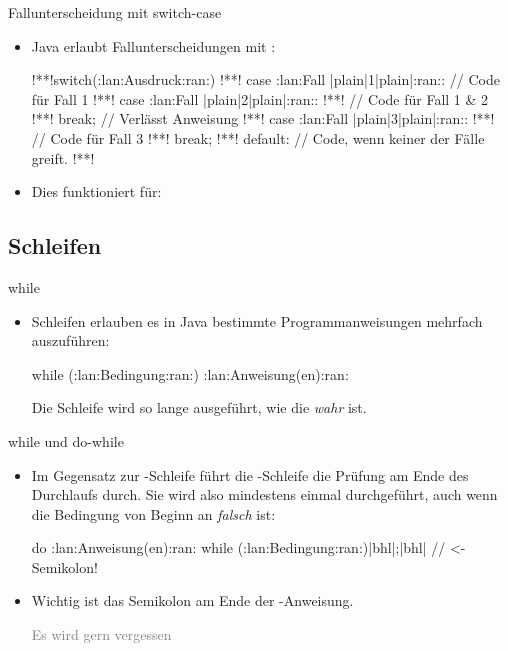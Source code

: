 \begin{frame}[fragile]{Fallunterscheidung mit switch-case}
    \begin{itemize}[<+(1)->]
        \item Java erlaubt Fallunterscheidungen mit :\pause{}
\begin{plainjava}
!**!switch(:lan:Ausdruck:ran:){
!**!    case :lan:Fall |plain|1|plain|:ran:: // Code für Fall 1
!**!    case :lan:Fall |plain|2|plain|:ran::
!**!        // Code für Fall 1 & 2
!**!        break; // Verlässt Anweisung
!**!    case :lan:Fall |plain|3|plain|:ran::
!**!        // Code für Fall 3
!**!        break;
!**!    default: // Code, wenn keiner der Fälle greift.
!**!}
\end{plainjava}
    \item<10-> Dies funktioniert für: 
    \end{itemize}
\end{frame}

\subsection{Schleifen}

\begin{frame}[fragile]{while}
    \begin{itemize}[<+(1)->]
        \item Schleifen erlauben es in Java bestimmte Programmanweisungen mehrfach auszuführen:\pause{}
        \begin{plainjava}
while (:lan:Bedingung:ran:) {
    :lan:Anweisung(en):ran:
}
        \end{plainjava}
        \pause{}Die Schleife wird so lange ausgeführt, wie die  \emph{wahr} ist.
    \end{itemize}
\end{frame}

\begin{frame}[fragile]{while und do-while}
    \begin{itemize}[<+(1)->]
        \item Im Gegensatz zur -Schleife führt die -Schleife die Prüfung am Ende des Durchlaufs durch.\pause{} Sie wird also mindestens einmal durchgeführt,\pause{} auch wenn die Bedingung von Beginn an \emph{falsch} ist:
        \begin{plainjava}
do {
    :lan:Anweisung(en):ran:
} while (:lan:Bedingung:ran:)|bhl|;|bhl| // <- Semikolon!
        \end{plainjava}
        \item Wichtig ist das Semikolon am Ende der -Anweisung.\par \textcolor{gray}{Es wird gern vergessen}
    \end{itemize}
\end{frame}

